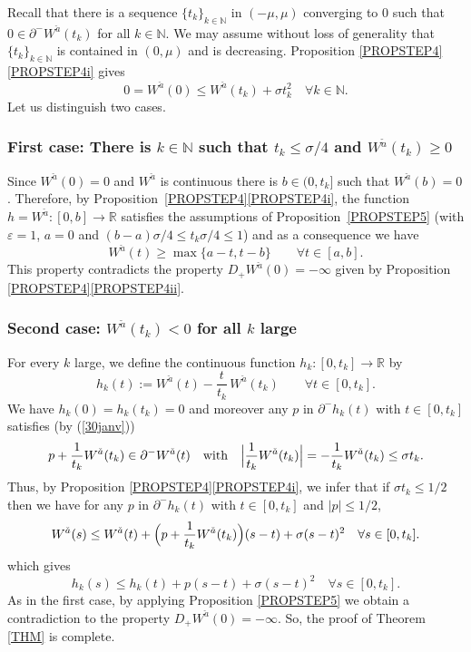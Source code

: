 \documentclass[JEP,XML,SOM,Unicode,NoFloatCountersInSection,published]{cedram}
\let\epsilon\varepsilon
\newcommand\R{\mathbb R}
\newcommand\N{\mathbb N}
\theoremstyle{definition}
\begin{document}
Recall that there is a sequence $\{t_k\}_{k\in \N}$ in $(-\mu,\mu)$ converging to $0$ such that $0\in \partial^-W^{\check{a}}(t_k)$ for all $k\in \N$. We may assume without loss of generality that $\{t_k\}_{k\in \N}$ is contained in $(0,\mu)$ and is decreasing. Proposition \ref{PROPSTEP4}\eqref{PROPSTEP4i} gives
\begin{equation}\label{30janv}
0 = W^{\check{a}}(0) \leq W^{\check{a}}(t_k) +\sigma t_k^2 \quad \forall k \in \N.
\end{equation}
Let us distinguish two cases. 

\subsubsection*{First case: There is $k\in \N$ such that $t_k \leq \sigma/4$ and $W^{\check{a}}(t_k)\geq 0$}
Since $W^{\check{a}}(0)=0$ and $W^{\check{a}}$ is continuous there is $b\in (0,t_k]$ such that $W^{\check{a}}(b)=0$. Therefore, by Proposi\-tion~\ref{PROPSTEP4}\eqref{PROPSTEP4i}, the function $h=W^{\check{a}}:[0,b] \to \R$ satisfies the assumptions of Proposi\-tion~\ref{PROPSTEP5} (with $\epsilon=1$, $a=0$ and $(b-a)\sigma/4 \leq t_k\sigma/4\leq 1$) and as a consequence we have
\[
W^{\check{a}} (t) \geq \max\bigl\{a-t, t-b\bigr\} \qquad \forall t \in [a,b].
\]
This property contradicts the property $D_+W^{\check{a}}(0)=-\infty$ given by Proposition \ref{PROPSTEP4}\eqref{PROPSTEP4ii}.

\subsubsection*{Second case: $W^{\check{a}}(t_k)< 0$ for all $k$ large}
For every $k$ large, we define the continuous function $h_k:[0,t_k] \to \R$ by
\[
h_k(t) := W^{\check{a}}(t) - \frac{t}{t_k} \, W^{\check{a}}(t_k) \qquad \forall t \in [0,t_k].
\]
We have $h_k(0)=h_k(t_k)=0$ and moreover any $p$ in $\partial^-h_k(t)$ with $t\in [0,t_k]$ satisfies (by (\ref{30janv}))
\[
p + \frac{1}{t_k} W^{\check{a}}(t_k) \in \partial^-W^{\check{a}}(t) \quad \text{with} \quad \Bigl| \frac{1}{t_k} W^{\check{a}}(t_k) \Bigr| = - \frac{1}{t_k} W^{\check{a}}(t_k) \leq \sigma t_k.
\]
Thus, by Proposition \ref{PROPSTEP4}\eqref{PROPSTEP4i}, we infer that if $\sigma t_k\leq 1/2$ then we have for any $p$ in $\partial^-h_k(t)$ with $t\in [0,t_k]$ and $|p| \leq 1/2$,
\begin{equation*}
W^{\check{a}}(s) \leq W^{\check{a}}(t) + \Bigl(p+ \frac{1}{t_k} W^{\check{a}}(t_k) \Bigr) (s-t)+\sigma (s-t)^2 \quad \forall s \in [0,t_k].
\end{equation*}
which gives
\begin{equation*}
h_k(s) \leq h_k(t) + p(s-t)+\sigma (s-t)^2 \quad \forall s \in [0,t_k].
\end{equation*}
As in the first case, by applying Proposition \ref{PROPSTEP5} we obtain a contradiction to the property $D_+W^{\check{a}}(0)=-\infty$. So, the proof of Theorem \ref{THM} is complete.
\end{document}
